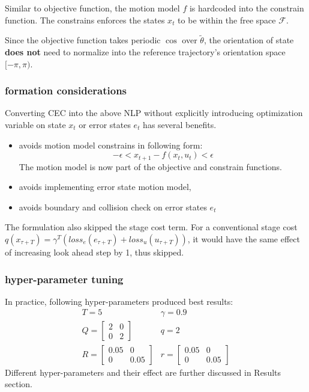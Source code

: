 \documentclass[conference]{IEEEtran}
\begin{document}
Similar to objective function, the motion model $f$ is hardcoded into the constrain function.
The constrains enforces the states $x_t$ to be within the free space $\mathcal{F}$.

Since the objective function takes periodic $\cos$ over $\tilde{\theta}$,
the orientation of state \textbf{does not} need to 
normalize into the reference trajectory's orientation space $[-\pi, \pi)$.

\subsubsection{formation considerations}
Converting CEC into the above NLP without explicitly introducing 
optimization variable on state $x_t$ or error states $e_t$ has several benefits.
\begin{itemize}
    \item avoids motion model constrains in following form: 
    \[-\epsilon < x_{t+1} - f(x_t, u_t) <\epsilon\]
    The motion model is now part of the objective and constrain functions.
    \item avoids implementing error state motion model,
    \item avoids boundary and collision check on error states $e_t$ 
    \end{itemize}

The formulation also skipped the stage cost term.
For a conventional stage cost $q(x_{\tau+T}) = \gamma^T (loss_e(e_{\tau+T}) + loss_u(u_{\tau+T}))$,
it would have the same effect of increasing look ahead step by 1, thus skipped.

\subsubsection{hyper-parameter tuning}
In practice, following hyper-parameters produced best results:
\[
\begin{array}{ll}
    T=5
    &\gamma = 0.9\\ 
    Q=\left[ \begin{matrix}2&0\\ 0&2\end{matrix}  \right] 
    &q=2\\ 
    R=\left[ \begin{matrix}0.05&0\\ 0&0.05\end{matrix}  \right] 
    &r=\left[ \begin{matrix}0.05&0\\ 0&0.05\end{matrix}  \right] 
\end{array} 
\]
Different hyper-parameters and their effect are further discussed in Results section.
\end{document}
